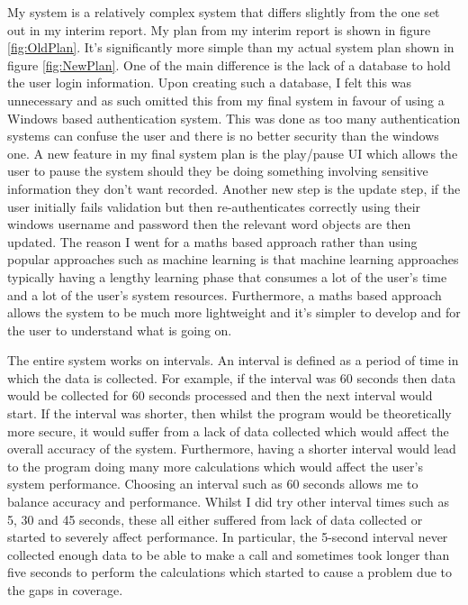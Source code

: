 \documentclass[10pt,a4paper]{report}
\begin{document}
My system is a relatively complex system that differs slightly from the one set out in my interim report. My plan from my interim report is shown in figure \ref{fig:OldPlan}. It's significantly more simple than my actual system plan shown in figure \ref{fig:NewPlan}. One of the main difference is the lack of a database to hold the user login information. Upon creating such a database, I felt this was unnecessary and as such omitted this from my final system in favour of using a Windows based authentication system. This was done as too many authentication systems can confuse the user and there is no better security than the windows one. A new feature in my final system plan is the play/pause UI which allows the user to pause the system should they be doing something involving sensitive information they don't want recorded. Another new step is the update step, if the user initially fails validation but then re-authenticates correctly using their windows username and password then the relevant word objects are then updated. The reason I went for a maths based approach rather than using popular approaches such as machine learning is that machine learning approaches typically having a lengthy learning phase that consumes a lot of the user's time and a lot of the user's system resources. Furthermore, a maths based approach allows the system to be much more lightweight and it's simpler to develop and for the user to understand what is going on.

The entire system works on intervals. An interval is defined as a period of time in which the data is collected. For example, if the interval was 60 seconds then data would be collected for 60 seconds processed and then the next interval would start. If the interval was shorter, then whilst the program would be theoretically more secure, it would suffer from a lack of data collected which would affect the overall accuracy of the system. Furthermore, having a shorter interval would lead to the program doing many more calculations which would affect the user's system performance. Choosing an interval such as 60 seconds allows me to balance accuracy and performance. Whilst I did try other interval times such as 5, 30 and 45 seconds, these all either suffered from lack of data collected or started to severely affect performance. In particular, the 5-second interval never collected enough data to be able to make a call and sometimes took longer than five seconds to perform the calculations which started to cause a problem due to the gaps in coverage.
\end{document}
